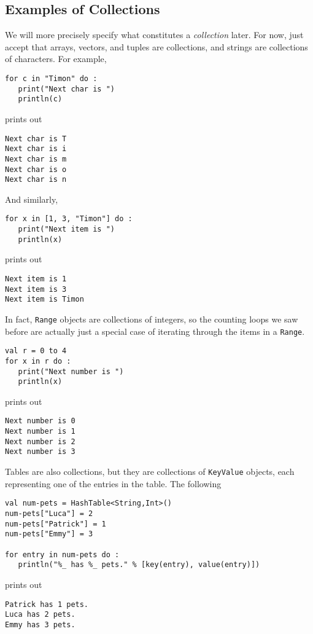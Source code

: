\documentclass[10pt,oneside]{book}
\begin{document}
\subsection*{Examples of Collections}
We will more precisely specify what constitutes a {\em collection} later. For now, just accept that arrays, vectors, and tuples are collections, and strings are collections of characters. For example,
\begin{lstlisting}
for c in "Timon" do :
   print("Next char is ")
   println(c)
\end{lstlisting}
prints out
\begin{lstlisting}
Next char is T
Next char is i
Next char is m
Next char is o
Next char is n
\end{lstlisting}

And similarly,
\begin{lstlisting}
for x in [1, 3, "Timon"] do :
   print("Next item is ")
   println(x)
\end{lstlisting}
prints out
\begin{lstlisting}
Next item is 1
Next item is 3
Next item is Timon
\end{lstlisting}

In fact, \texttt{\frenchspacing Range} objects are collections of integers, so the counting loops we saw before are actually just a special case of iterating through the items in a \texttt{\frenchspacing Range}. 
\begin{lstlisting}
val r = 0 to 4
for x in r do :
   print("Next number is ")
   println(x)
\end{lstlisting}
prints out
\begin{lstlisting}
Next number is 0
Next number is 1
Next number is 2
Next number is 3
\end{lstlisting}

Tables are also collections, but they are collections of \texttt{\frenchspacing KeyValue} objects, each representing one of the entries in the table. The following
\begin{lstlisting}
val num-pets = HashTable<String,Int>()
num-pets["Luca"] = 2
num-pets["Patrick"] = 1
num-pets["Emmy"] = 3

for entry in num-pets do :
   println("%_ has %_ pets." % [key(entry), value(entry)])
\end{lstlisting}
prints out
\begin{lstlisting}
Patrick has 1 pets.
Luca has 2 pets.
Emmy has 3 pets.
\end{lstlisting}
\end{document}
